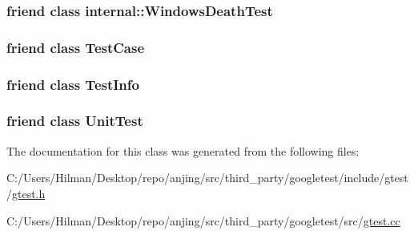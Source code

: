 \subsubsection[{internal\+::\+Windows\+Death\+Test}]{\setlength{\rightskip}{0pt plus 5cm}friend class internal\+::\+Windows\+Death\+Test\hspace{0.3cm}{\ttfamily [friend]}}\label{classtesting_1_1_test_result_a6aeedc04a0590fcc1b3c5f687dbb0f9f}
\hypertarget{classtesting_1_1_test_result_aff779e55b06adfa7c0088bd10253f0f0}{}
\subsubsection[{Test\+Case}]{\setlength{\rightskip}{0pt plus 5cm}friend class {\bf Test\+Case}\hspace{0.3cm}{\ttfamily [friend]}}\label{classtesting_1_1_test_result_aff779e55b06adfa7c0088bd10253f0f0}
\hypertarget{classtesting_1_1_test_result_a4c49c2cdb6c328e6b709b4542f23de3c}{}
\subsubsection[{Test\+Info}]{\setlength{\rightskip}{0pt plus 5cm}friend class {\bf Test\+Info}\hspace{0.3cm}{\ttfamily [friend]}}\label{classtesting_1_1_test_result_a4c49c2cdb6c328e6b709b4542f23de3c}
\hypertarget{classtesting_1_1_test_result_a832b4d233efee1a32feb0f4190b30d39}{}
\subsubsection[{Unit\+Test}]{\setlength{\rightskip}{0pt plus 5cm}friend class {\bf Unit\+Test}\hspace{0.3cm}{\ttfamily [friend]}}\label{classtesting_1_1_test_result_a832b4d233efee1a32feb0f4190b30d39}


The documentation for this class was generated from the following files\+:\begin{DoxyCompactItemize}
\item 
C\+:/\+Users/\+Hilman/\+Desktop/repo/anjing/src/third\+\_\+party/googletest/include/gtest/\hyperlink{gtest_8h}{gtest.\+h}\item 
C\+:/\+Users/\+Hilman/\+Desktop/repo/anjing/src/third\+\_\+party/googletest/src/\hyperlink{gtest_8cc}{gtest.\+cc}\end{DoxyCompactItemize}
